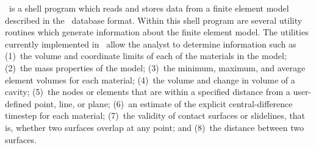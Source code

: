 \numbers\ is a shell program which reads and stores data from a finite
element model described in the \exo\ database format. Within this shell
program are several utility routines which generate information about
the finite element model.  The utilities currently implemented in
\numbers\ allow the analyst to determine information such as (1)~the
volume and coordinate limits of each of the materials in the model;
(2)~the mass properties of the model; (3)~the minimum, maximum, and
average element volumes for each material; (4)~the volume and change in
volume of a cavity; (5)~the nodes or elements that are within a
specified distance from a user-defined point, line, or plane; (6)~an
estimate of the explicit central-difference timestep for each material;
(7)~the validity of contact surfaces or slidelines, that is, whether two
surfaces overlap at any point; and (8)~the distance between two
surfaces.
